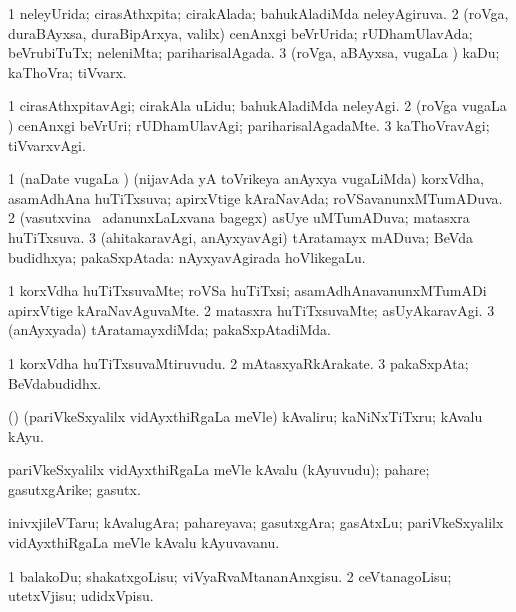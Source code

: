 \bentry
{}
\gl{\gu}
\bmng
\bnum
\num{1} neleyUrida; cirasAthxpita; cirakAlada; bahukAladiMda neleyAgiruva. 
\num{2} (roVga, duraBAyxsa, duraBipArxya, \mo valilx) cenAnxgi beVrUrida; rUDhamUlavAda; beVrubiTuTx; neleniMta; pariharisalAgada. 
\num{3} (roVga, aBAyxsa, \mo vugaLa \vi) kaDu; kaThoVra; tiVvarx. 
\enum
\emng
\eentry

\bentry
{}
\gl{\kirxvi}
\bmng
\bnum
\num{1} cirasAthxpitavAgi; cirakAla uLidu; bahukAladiMda neleyAgi. 
\num{2} (roVga \mo vugaLa \vi) cenAnxgi beVrUri; rUDhamUlavAgi; pariharisalAgadaMte. 
\num{3} kaThoVravAgi; tiVvarxvAgi. 
\enum
\emng
\eentry

\bentry
{}
\gl{\gu}
\bmng
\bnum
\num{1} (naDate \mo vugaLa \vi) (nijavAda yA toVrikeya anAyxya \mo vugaLiMda) korxVdha, asamAdhAna huTiTxsuva; apirxVtige kAraNavAda; roVSavanunxMTumADuva. 
\num{2} (vasutxvina \vi\ adanunxLaLxvana bagegx) asUye uMTumADuva; matasxra huTiTxsuva. 
\num{3} (ahitakaravAgi, anAyxyavAgi) tAratamayx mADuva; BeVda budidhxya; pakaSxpAtada:  nAyxyavAgirada hoVlikegaLu. 
\enum
\emng
\eentry

\bentry
{}
\gl{\kirxvi}
\bmng
\bnum
\num{1} korxVdha huTiTxsuvaMte; roVSa huTiTxsi; asamAdhAnavanunxMTumADi apirxVtige kAraNavAguvaMte. 
\num{2} matasxra huTiTxsuvaMte; asUyAkaravAgi. 
\num{3} (anAyxyada) tAratamayxdiMda; pakaSxpAtadiMda. 
\enum
\emng
\eentry

\bentry
{}
\gl{\nA}
\bmng
\bnum
\num{1} korxVdha huTiTxsuvaMtiruvudu. 
\num{2} mAtasxyaRkArakate. 
\num{3} pakaSxpAta; BeVdabudidhx. 
\enum
\emng
\eentry

\bentry
{}
\gl{\akirx}
\bmng
(\birx) (pariVkeSxyalilx vidAyxthiRgaLa meVle) kAvaliru; kaNiNxTiTxru; kAvalu kAyu. 
\emng
\eentry

\bentry
{}
\gl{\nA}
\bmng
pariVkeSxyalilx vidAyxthiRgaLa meVle 
\emng
kAvalu (kAyuvudu); pahare; gasutxgArike; gasutx. \eentry

\bentry
{}
\gl{\nA}
\bmng
inivxjileVTaru; kAvalugAra; pahareyava; gasutxgAra; gasAtxLu; pariVkeSxyalilx vidAyxthiRgaLa meVle kAvalu kAyuvavanu. 
\emng
\eentry

\bentry
{}
\gl{\sakirx}
\bmng
\bnum
\num{1} balakoDu; shakatxgoLisu; viVyaRvaMtananAnxgisu. 
\num{2} ceVtanagoLisu; utetxVjisu; udidxVpisu. 
\enum
\emng
\eentry

